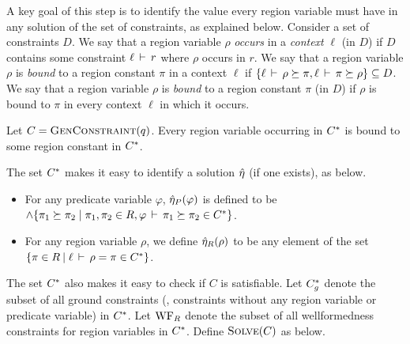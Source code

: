 A key goal of this step is to identify the value every region variable must
have in any solution of the set of constraints, as explained below.
%
%
Consider a set of constraints $D$. We say that a region variable $\rho$
\emph{occurs} in a \emph{context} $\ell$ (in $D$) if $D$ contains some
constraint $\ell\,\vdash\,r$ where $\rho$ occurs in $r$.
We say that a region variable $\rho$ is \emph{bound} to a region constant
$\pi$ in a context $\ell$ if
$\{ \ell\,\vdash\,\rho \succeq \pi, \ell\,\vdash\,\pi \succeq \rho \} \subseteq D$.
We say that a region variable $\rho$ is \emph{bound} to a region constant $\pi$ (in $D$) if
$\rho$ is bound to $\pi$ in every context $\ell$ in which it occurs.

\begin{lemma}
  \label{lemma:completely-bound}
Let $C = \textsc{GenConstraint}(q)$.
Every region variable occurring in ${C}^*$ is bound to some region constant in ${C}^*$.
\end{lemma}

The set ${C}^*$ makes it easy to identify a solution $\hat{\eta}$ (if one exists), as below.
\begin{itemize}
\item For any predicate variable $\varphi$, $\hat{\eta}_P(\varphi)$ is defined
to be $\wedge \{ \pi_1 \succeq \pi_2 \;|\; \pi_1, \pi_2 \in R, \varphi\,\vdash\,\pi_1 \succeq \pi_2 \in {C}^* \}$.
\item For any region variable $\rho$, we define $\hat{\eta}_R(\rho)$ to be any element of the
set $\{ \pi \in R \:|\; \ell\,\vdash\,\rho = \pi \in {C}^* \}$.
\end{itemize}



The set ${C}^*$ also makes it easy to check if $C$ is satisfiable.
Let ${C}^*_g$ denote the subset of all ground constraints
(\ie, constraints without any region variable or predicate variable)
in ${C}^*$. Let $\text{WF}_R$ denote the subset of all wellformedness
constraints for region variables in ${C}^*$.
Define $\textsc{Solve}(C)$ as below.

